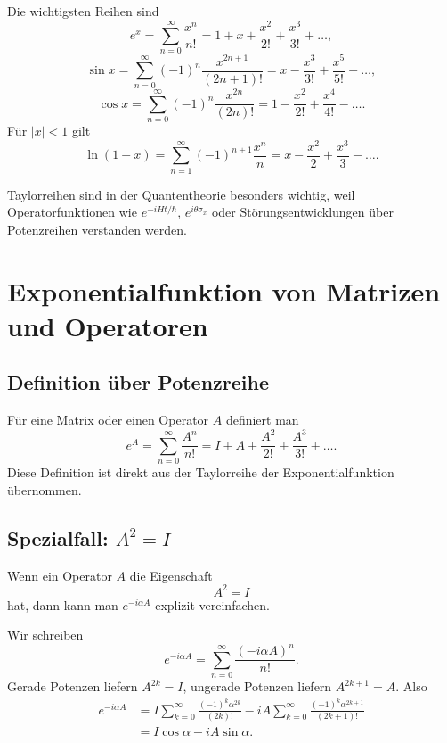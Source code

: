 Die wichtigsten Reihen sind
\[
    e^x=\sum_{n=0}^{\infty}\frac{x^n}{n!}
    =1+x+\frac{x^2}{2!}+\frac{x^3}{3!}+\dots,
\]
\[
    \sin x=\sum_{n=0}^{\infty}(-1)^n\frac{x^{2n+1}}{(2n+1)!}
    =x-\frac{x^3}{3!}+\frac{x^5}{5!}-\dots,
\]
\[
    \cos x=\sum_{n=0}^{\infty}(-1)^n\frac{x^{2n}}{(2n)!}
    =1-\frac{x^2}{2!}+\frac{x^4}{4!}-\dots.
\]
Für $|x|<1$ gilt
\[
    \ln(1+x)=\sum_{n=1}^{\infty}(-1)^{n+1}\frac{x^n}{n}
    =x-\frac{x^2}{2}+\frac{x^3}{3}-\dots.
\]

\begin{conceptbox}
Taylorreihen sind in der Quantentheorie besonders wichtig, weil Operatorfunktionen wie $e^{-iHt/\hbar}$, $e^{i\theta\sigma_x}$ oder Störungsentwicklungen über Potenzreihen verstanden werden.
\end{conceptbox}

\section{Exponentialfunktion von Matrizen und Operatoren}

\subsection{Definition über Potenzreihe}

Für eine Matrix oder einen Operator $A$ definiert man
\[
    e^A=\sum_{n=0}^{\infty}\frac{A^n}{n!}
    =I+A+\frac{A^2}{2!}+\frac{A^3}{3!}+\dots.
\]
Diese Definition ist direkt aus der Taylorreihe der Exponentialfunktion übernommen.

\subsection{Spezialfall: $A^2=I$}

Wenn ein Operator $A$ die Eigenschaft
\[
    A^2=I
\]
hat, dann kann man $e^{-i\alpha A}$ explizit vereinfachen.

\begin{derivationbox}
Wir schreiben
\[
    e^{-i\alpha A}
    =\sum_{n=0}^{\infty}\frac{(-i\alpha A)^n}{n!}.
\]
Gerade Potenzen liefern $A^{2k}=I$, ungerade Potenzen liefern $A^{2k+1}=A$. Also
\[
\begin{aligned}
    e^{-i\alpha A}
    &= I\sum_{k=0}^{\infty}\frac{(-1)^k\alpha^{2k}}{(2k)!}
    -iA\sum_{k=0}^{\infty}\frac{(-1)^k\alpha^{2k+1}}{(2k+1)!}\\
    &=I\cos\alpha-iA\sin\alpha.
\end{aligned}
\]
\end{derivationbox}

